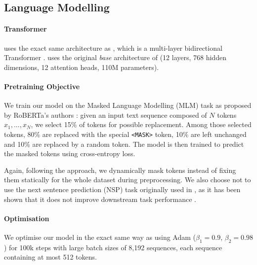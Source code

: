 \subsection{Language Modelling}

\paragraph{Transformer}
\dalembert uses the exact same architecture as \roberta, which is a multi-layer bidirectional Transformer \cite{vaswani-etal-2017-attention}.
\dalembert uses the original \emph{base} architecture of \roberta (12 layers, 768 hidden dimensions, 12 attention heads, 110M parameters).

\paragraph{Pretraining Objective}
We train our model on the Masked Language Modelling (MLM) task as proposed by RoBERTa's authors \cite{liu-etal-2019-roberta}: given an input text sequence composed of $N$ tokens $x_1, ..., x_N$, we select 15\% of tokens for possible replacement. Among those selected tokens, 80\% are replaced with the special \texttt{<MASK>} token, 10\% are left unchanged and 10\% are replaced by a random token. The model is then trained to predict the masked tokens using cross-entropy loss.

Again, following the \roberta approach, we dynamically mask tokens instead of fixing them statically for the whole dataset during preprocessing. We also choose not to use the next sentence prediction (NSP) task originally used in \bert \cite{devlin-etal-2019-bert}, as it has been shown that it does not improve downstream task performance \cite{conneau-lample-2019-cross,liu-etal-2019-roberta}.

\paragraph{Optimisation}
We optimise our model in the exact same way as \cite{liu-etal-2019-roberta} using Adam \cite{kingma-ba-2015-adam} ($\beta_1 = 0.9$, $\beta_2 = 0.98$) for 100k steps with large batch sizes of 8,192 sequences, each sequence containing at most 512 tokens.

